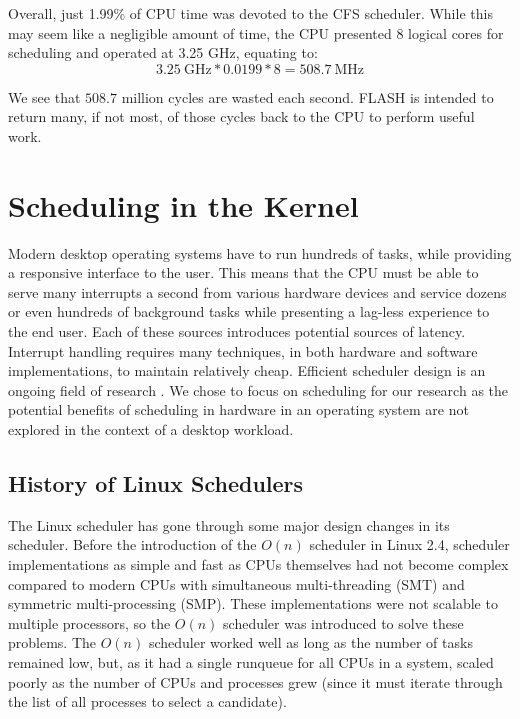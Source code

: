 \documentclass{sig-alternate-10pt}
\begin{document}
Overall, just 1.99\% of CPU time was devoted to the CFS scheduler. While this may seem like a negligible amount of time, the CPU presented 8 logical cores for scheduling and operated at 3.25 GHz, equating to:
\begin{equation*}
	3.25\ \text{GHz}*0.0199*8 = 508.7\ \text{MHz}
\end{equation*}

We see that $508.7$ million cycles are wasted each second. FLASH is intended
to return many, if not most, of those cycles back to the CPU to perform
useful work.

\section{Scheduling in the Kernel}
\label{sec:sched_in_kernel}
Modern desktop operating systems have to run hundreds of tasks, while providing a responsive interface to the user. This means that the CPU must be able to serve many interrupts a second from various hardware devices and service dozens or even hundreds of background tasks while presenting a lag-less experience to the end user. Each of these sources introduces potential sources of latency. Interrupt handling \cite{regehr2007safe} requires many techniques, in both hardware and software implementations, to maintain relatively cheap. Efficient scheduler design is an ongoing field of research \cite{wong2008cfs, park2008hardware, morton2004hardware}. We chose to focus on scheduling for our research as the potential benefits of scheduling in hardware in an operating system are not explored in the context of a desktop workload.

\subsection{History of Linux Schedulers}
The Linux scheduler has gone through some major design changes in its scheduler. Before the introduction of the $ O(n) $ scheduler in Linux 2.4, scheduler implementations as simple and fast as CPUs themselves had not become complex compared to modern CPUs with simultaneous multi-threading (SMT) and symmetric multi-processing (SMP). These implementations were not scalable to multiple processors, so the $ O(n) $ scheduler was introduced to solve these problems. The $ O(n) $ scheduler worked well as long as the number of tasks remained low, but, as it had a single runqueue for all CPUs in a system, scaled poorly as the number of CPUs and processes grew (since it must iterate through the list of all processes to select a candidate).
\end{document}
